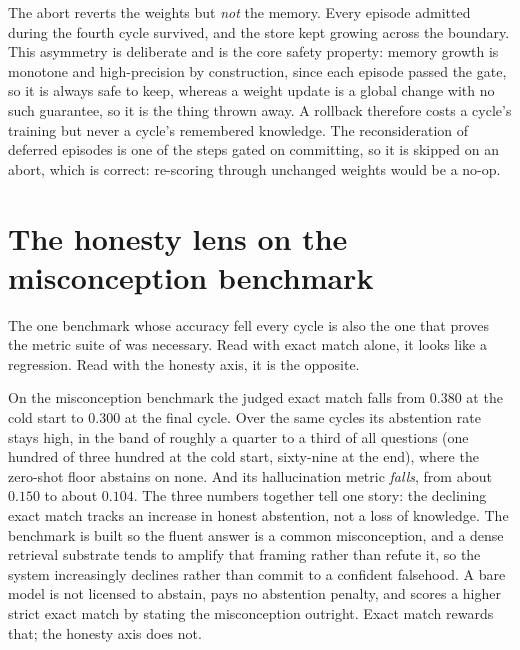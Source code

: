 \begin{intuition}
The abort reverts the weights but \emph{not} the memory. Every episode admitted during
the fourth cycle survived, and the store kept growing across the boundary. This
asymmetry is deliberate and is the core safety property: memory growth is monotone and
high-precision by construction, since each episode passed the gate, so it is always
safe to keep, whereas a weight update is a global change with no such guarantee, so it
is the thing thrown away. A rollback therefore costs a cycle's training but never a
cycle's remembered knowledge. The reconsideration of deferred episodes is one of the
steps gated on committing, so it is skipped on an abort, which is correct: re-scoring
through unchanged weights would be a no-op.
\end{intuition}

\section{The honesty lens on the misconception benchmark}
\label{sec:traj-honesty}

The one benchmark whose accuracy fell every cycle is also the one that proves the
metric suite of  was necessary. Read with exact match alone, it
looks like a regression. Read with the honesty axis, it is the opposite.

\begin{bythenumbers}
On the misconception benchmark the judged exact match falls from $0.380$ at the cold
start to $0.300$ at the final cycle. Over the same cycles its abstention rate stays
high, in the band of roughly a quarter to a third of all questions (one hundred of
three hundred at the cold start, sixty-nine at the end), where the zero-shot floor
abstains on none. And its hallucination metric \emph{falls}, from about $0.150$ to
about $0.104$. The three numbers together tell one story: the declining exact match
tracks an increase in honest abstention, not a loss of knowledge. The benchmark is
built so the fluent answer is a common misconception, and a dense retrieval substrate
tends to amplify that framing rather than refute it, so the system increasingly
declines rather than commit to a confident falsehood. A bare model is not licensed to
abstain, pays no abstention penalty, and scores a higher strict exact match by stating
the misconception outright. Exact match rewards that; the honesty axis does not.
\end{bythenumbers}

